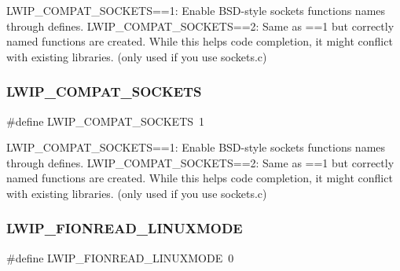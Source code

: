 L\+W\+I\+P\+\_\+\+C\+O\+M\+P\+A\+T\+\_\+\+S\+O\+C\+K\+E\+TS==1\+: Enable B\+S\+D-\/style sockets functions names through defines. L\+W\+I\+P\+\_\+\+C\+O\+M\+P\+A\+T\+\_\+\+S\+O\+C\+K\+E\+TS==2\+: Same as ==1 but correctly named functions are created. While this helps code completion, it might conflict with existing libraries. (only used if you use sockets.\+c) \mbox{\label{group__lwip__opts__socket_gafed2811f031822ec5afa1ee211fb7447}} 
\subsubsection{\texorpdfstring{L\+W\+I\+P\+\_\+\+C\+O\+M\+P\+A\+T\+\_\+\+S\+O\+C\+K\+E\+TS}{LWIP\_COMPAT\_SOCKETS}\hspace{0.1cm}{\footnotesize\ttfamily [2/2]}}
{\footnotesize\ttfamily \#define L\+W\+I\+P\+\_\+\+C\+O\+M\+P\+A\+T\+\_\+\+S\+O\+C\+K\+E\+TS~1}

L\+W\+I\+P\+\_\+\+C\+O\+M\+P\+A\+T\+\_\+\+S\+O\+C\+K\+E\+TS==1\+: Enable B\+S\+D-\/style sockets functions names through defines. L\+W\+I\+P\+\_\+\+C\+O\+M\+P\+A\+T\+\_\+\+S\+O\+C\+K\+E\+TS==2\+: Same as ==1 but correctly named functions are created. While this helps code completion, it might conflict with existing libraries. (only used if you use sockets.\+c) \mbox{\label{group__lwip__opts__socket_ga0543eea2abe390d0bdc843c33debd762}} 
\subsubsection{\texorpdfstring{L\+W\+I\+P\+\_\+\+F\+I\+O\+N\+R\+E\+A\+D\+\_\+\+L\+I\+N\+U\+X\+M\+O\+DE}{LWIP\_FIONREAD\_LINUXMODE}\hspace{0.1cm}{\footnotesize\ttfamily [1/2]}}
{\footnotesize\ttfamily \#define L\+W\+I\+P\+\_\+\+F\+I\+O\+N\+R\+E\+A\+D\+\_\+\+L\+I\+N\+U\+X\+M\+O\+DE~0}

